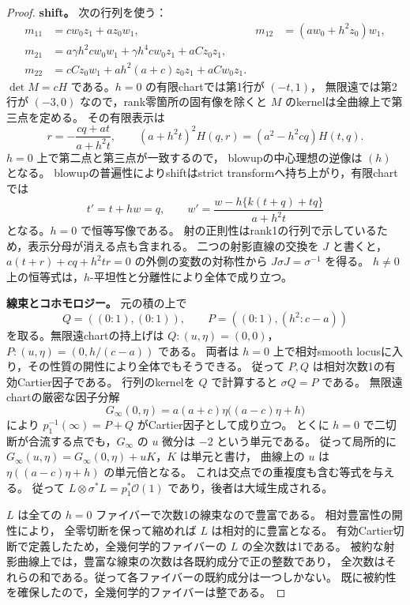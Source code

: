 \begin{proof}
\textbf{shift。}
次の行列を使う：
\[
 \begin{aligned}
 m_{11}&=cw_0z_1+az_0w_1,&
 m_{12}&=(aw_0+h^2z_0)w_1,\\
 m_{21}&=a\gamma h^2cw_0w_1+\gamma h^4cw_0z_1+aCz_0z_1,\\
 m_{22}&=cCz_0w_1+ah^2(a+c)z_0z_1+aCw_0z_1.
 \end{aligned}
\]
$\det M=cH$ である。$h=0$ の有限chartでは第1行が $(-t,1)$，
無限遠では第2行が $(-3,0)$ なので，rank零箇所の固有像を除くと
$M$ のkernelは全曲線上で第三点を定める。
その有限表示は
\begin{equation}\label{eq:degree-one-integral-shift}
 r=-\frac{cq+at}{a+h^2t},\qquad
 (a+h^2t)^2H(q,r)=(a^2-h^2cq)H(t,q).
\end{equation}
$h=0$ 上で第二点と第三点が一致するので，
blowupの中心理想の逆像は $(h)$ となる。
blowupの普遍性によりshiftはstrict transformへ持ち上がり，有限chartでは
\begin{equation}\label{eq:degree-one-integral-lifted-shift}
 t'=t+hw=q,\qquad
 w'=\frac{w-h\{k(t+q)+tq\}}{a+h^2t}
\end{equation}
となる。$h=0$ で恒等写像である。
射の正則性はrank1の行列で示しているため，表示分母が消える点も含まれる。
二つの射影直線の交換を $J$ と書くと，
$a(t+r)+cq+h^2tr=0$ の外側の変数の対称性から $J\sigma J=\sigma^{-1}$ を得る。
$h\ne0$ 上の恒等式は，$h$-平坦性と分離性により全体で成り立つ。

\textbf{線束とコホモロジー。}
元の積の上で
\[
 Q=((0:1),(0:1)),\qquad
 P=((0:1),(h^2:c-a))
\]
を取る。無限遠chartの持上げは
$Q:(u,\eta)=(0,0)$，$P:(u,\eta)=(0,h/(c-a))$ である。
両者は $h=0$ 上で相対smooth locusに入り，その性質の開性により全体でもそうできる。
従って $P,Q$ は相対次数1の有効Cartier因子である。
行列のkernelを $Q$ で計算すると $\sigma Q=P$ である。
無限遠chartの厳密な因子分解
\begin{equation}\label{eq:degree-one-integral-infinity}
 G_\infty(0,\eta)=a(a+c)\eta\bigl((a-c)\eta+h\bigr)
\end{equation}
により $p_1^{-1}(\infty)=P+Q$ がCartier因子として成り立つ。
とくに $h=0$ で二切断が合流する点でも，$G_\infty$ の $u$ 微分は $-2$ という単元である。
従って局所的に $G_\infty(u,\eta)=G_\infty(0,\eta)+uK$，$K$ は単元と書け，
曲線上の $u$ は $\eta((a-c)\eta+h)$ の単元倍となる。
これは交点での重複度も含む等式を与える。
従って $L\otimes\sigma^*L=p_1^*\mathcal O(1)$ であり，後者は大域生成される。

$L$ は全ての $h=0$ ファイバーで次数1の線束なので豊富である。
相対豊富性の開性\cite[Proposition 2.5]{Keeler2003}により，
全零切断を保って縮めれば $L$ は相対的に豊富となる。
有効Cartier切断で定義したため，全幾何学的ファイバーの $L$ の全次数は1である。
被約な射影曲線上では，豊富な線束の次数は各既約成分で正の整数であり，
全次数はそれらの和である。従って各ファイバーの既約成分は一つしかない。
既に被約性を確保したので，全幾何学的ファイバーは整である。


\end{proof}
